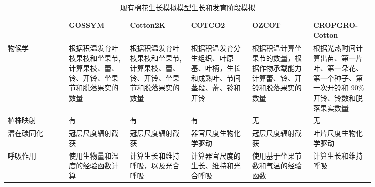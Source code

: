\documentclass[a4paper,zihao=5]{ctexbook}
\begin{document}
\begin{table}
    \small
    \caption{现有棉花生长模拟模型生长和发育阶段模拟}
    \label{tab:growdev}
    \begin{tabular}{p{0.14\linewidth}p{0.14\linewidth}p{0.14\linewidth}p{0.14\linewidth}p{0.14\linewidth}p{0.14\linewidth}}
        \toprule
                   & GOSSYM                                                                       & Cotton2K                                                                     & COTCO2                                                                   & OZCOT                                                                      & CROPGRO-Cotton                                                                                   \\
        \midrule
        物候学     & 根据积温发育叶枝果枝和坐果节, 计算果枝、蕾、铃、开铃、坐果节和脱落果实的数量 & 根据积温发育叶枝果枝和坐果节, 计算果枝、蕾、铃、开铃、坐果节和脱落果实的数量 & 根据积温发育分生组织、叶原基、叶柄，生长和成熟叶、节间茎段、蕾、铃和开铃 & 根据积温计算坐果节的数量，根据作物承载能力计算蕾、铃、开铃和脱落果实的数量 & 根据光热时间计算出苗、第一片叶、第一朵花、第一个种子、第一次开铃和 90\% 开铃、铃数和脱落果实数量 \\
        植株映射   & 有                                                                           & 有                                                                           & 有                                                                       & 无                                                                         & 无                                                                                               \\
        潜在碳同化 & 冠层尺度辐射截获                                                             & 冠层尺度辐射截获                                                             & 器官尺度生物化学驱动 \cite{farquhar1980}                                 & 冠层尺度辐射截获                                                           & 叶片尺度生物化学驱动 \cite{farquhar1980}                                                         \\
        呼吸作用   & 使用生物量和温度的经验函数计算                                               & 计算生长和维持呼吸，以及光合呼吸                                             & 计算器官尺度的生长、维持和光合呼吸                                       & 使用基于坐果节数和气温的经验函数                                           & 计算生长和维持呼吸                                                                               \\

\end{tabular}
\end{table}
\end{document}
